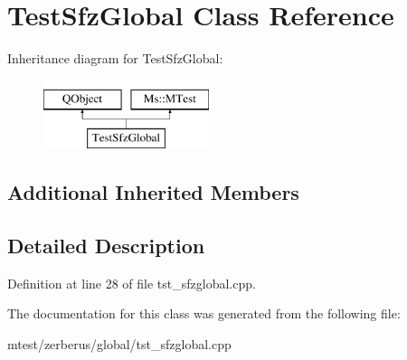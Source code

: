 \hypertarget{class_test_sfz_global}{}\section{Test\+Sfz\+Global Class Reference}
\label{class_test_sfz_global}
Inheritance diagram for Test\+Sfz\+Global\+:\begin{figure}[H]
\begin{center}
\leavevmode
\includegraphics[height=2.000000cm]{class_test_sfz_global}
\end{center}
\end{figure}
\subsection*{Additional Inherited Members}


\subsection{Detailed Description}


Definition at line 28 of file tst\+\_\+sfzglobal.\+cpp.



The documentation for this class was generated from the following file\+:\begin{DoxyCompactItemize}
\item 
mtest/zerberus/global/tst\+\_\+sfzglobal.\+cpp\end{DoxyCompactItemize}
